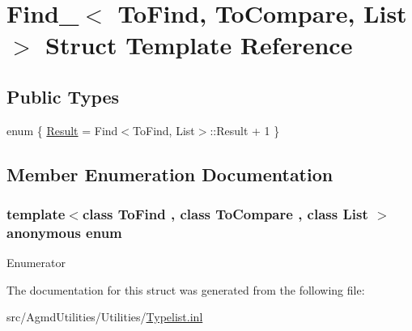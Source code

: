\hypertarget{struct_find__}{\section{Find\+\_\+$<$ To\+Find, To\+Compare, List $>$ Struct Template Reference}
\label{struct_find__}
}
\subsection*{Public Types}
\begin{DoxyCompactItemize}
\item 
enum \{ \hyperlink{struct_find___a52fc2aa356783b853ad19219f3b49088a0021ed4feabdf5233bcb6d9579b7dce5}{Result} = Find$<$To\+Find, List$>$\+:\+:Result + 1
 \}
\end{DoxyCompactItemize}


\subsection{Member Enumeration Documentation}
\hypertarget{struct_find___a52fc2aa356783b853ad19219f3b49088}{\subsubsection[{anonymous enum}]{\setlength{\rightskip}{0pt plus 5cm}template$<$class To\+Find , class To\+Compare , class List $>$ anonymous enum}}\label{struct_find___a52fc2aa356783b853ad19219f3b49088}
\begin{Desc}
\item[Enumerator]\par
\begin{description}
\item[{\em 
\hypertarget{struct_find___a52fc2aa356783b853ad19219f3b49088a0021ed4feabdf5233bcb6d9579b7dce5}{Result}\label{struct_find___a52fc2aa356783b853ad19219f3b49088a0021ed4feabdf5233bcb6d9579b7dce5}
}]\end{description}
\end{Desc}


The documentation for this struct was generated from the following file\+:\begin{DoxyCompactItemize}
\item 
src/\+Agmd\+Utilities/\+Utilities/\hyperlink{_typelist_8inl}{Typelist.\+inl}\end{DoxyCompactItemize}
